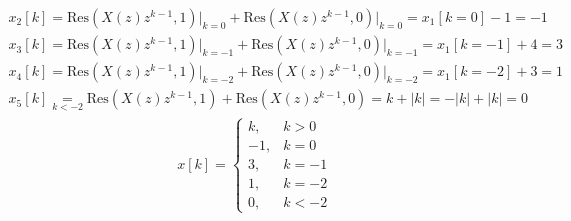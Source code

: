 \begin{align}
	x_2[k]=\mathrm{Res}(X(z)z^{k-1},1)\Bigg |_{k=0}+\mathrm{Res}(X(z)z^{k-1},0)\Bigg |_{k=0}=x_1[k=0]-1=-1
\end{align}
\begin{align}
	x_3[k]=\mathrm{Res}(X(z)z^{k-1},1)\Bigg |_{k=-1}+\mathrm{Res}(X(z)z^{k-1},0)\Bigg |_{k=-1}=x_1[k=-1]+4=3
\end{align}
\begin{align}
	x_4[k]=\mathrm{Res}(X(z)z^{k-1},1)\Bigg |_{k=-2}+\mathrm{Res}(X(z)z^{k-1},0)\Bigg |_{k=-2}=x_1[k=-2]+3=1
\end{align}
\begin{align}
	x_5[k]\underset{k <-2}{=}\mathrm{Res}(X(z)z^{k-1},1)+\mathrm{Res}(X(z)z^{k-1},0)=k+|k|=-|k|+|k|=0
\end{align}
\begin{align}
	x[k]=\begin{cases}
		k, &k>0 \\
		-1, &k=0 \\
		3, &k=-1 \\
		1, &k=-2 \\
		0, &k<-2
	\end{cases}
\end{align}
